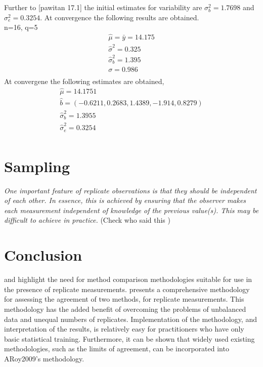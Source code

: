 \documentclass[12pt, a4paper]{report}
\theoremstyle{plain}
\theoremstyle{definition}
\theoremstyle{remark}
\begin{document}
	Further to [pawitan 17.1] the initial estimates for variability
	are $\sigma^{2}_{b} = 1.7698$ and $\sigma^{2}_{e} = 0.3254$. At
	convergence the following results are obtained.
	\\
	n=16, q=5
	\begin{eqnarray*}
		\hat{\mu} = \bar{y} = 14.175 \\
		\hat{\sigma}^2 = 0.325\\
		\hat{\sigma}^2_{b} = 1.395\\
		\sigma  = 0.986 \\
	\end{eqnarray*}
	At convergene the following estimates are obtained,
	\begin{eqnarray*}
		\hat{\mu} = 14.1751 \\
		\hat{b}= (-0.6211, 0.2683,1.4389,-1.914,0.8279)\\
		\hat{\sigma}^2_{b} = 1.3955\\
		\hat{\sigma}^2_{e} = 0.3254\\
	\end{eqnarray*}
	

	
	

	\section{Sampling}
	\emph{
		One important feature of replicate observations is that they should be independent
		of each other. In essence, this is achieved by ensuring that the observer makes each
		measurement independent of knowledge of the previous value(s). This may be difficult
		to achieve in practice.} (Check who said this
	)
	
	
	
	
	
	
	
	\section{Conclusion}
	\citet{BXC2008} and \citet{ARoy2009} highlight the need for method comparison methodologies suitable for use in the presence of replicate measurements. \citet{ARoy2009} presents a comprehensive methodology for assessing the agreement of two methods, for replicate measurements. This methodology has the added benefit of overcoming the problems of unbalanced data and unequal numbers of replicates. Implementation of the methodology, and interpretation of the results, is relatively easy for practitioners who have only basic statistical training. Furthermore, it can be shown that widely used existing methodologies, such as the limits of agreement, can be incorporated into ARoy2009's methodology.
	
\end{document}
